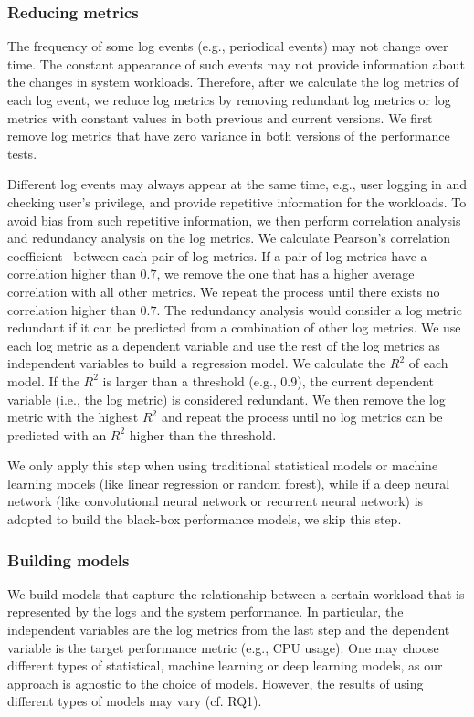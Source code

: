 \subsubsection{Reducing metrics}
The frequency of some log events (e.g., periodical events) may not change over time.
The constant appearance of such events may not provide information about the changes in system workloads.
Therefore, after we calculate the log metrics of each log event, we reduce log metrics by removing redundant log metrics or log metrics with constant values in both previous and current versions. We first remove log metrics that have zero variance in both versions of the performance tests. 

Different log events may always appear at the same time, e.g., user logging in and checking user's privilege, and provide repetitive information for the workloads. To avoid bias from such repetitive information, we then perform correlation analysis and redundancy analysis on the log metrics. We calculate Pearson's correlation coefficient~\citep{benesty2009pearson} between each pair of log metrics. If a pair of log metrics have a correlation higher than $0.7$, we remove the one that has a higher average correlation with all other metrics. 
We repeat the process until there exists no correlation higher than $0.7$. The redundancy analysis would consider a log metric redundant if it can be predicted from a combination of other log metrics. We use each log metric as a dependent variable and use the rest of the log metrics as independent variables to build a regression model. We calculate the $R^2$ of each model. If the $R^2$ is larger than a threshold (e.g., 0.9), the current dependent variable (i.e., the log metric) is considered redundant. We then remove the log metric with the highest $R^2$ and repeat the process until no log metrics can be predicted with an $R^2$ higher than the threshold. 

We only apply this step when using traditional statistical models or machine learning models (like linear regression or random forest), while if a deep neural network (like convolutional neural network or recurrent neural network) is adopted to build the black-box performance models, we skip this step.


\subsubsection{Building models}
We build models that capture the relationship between a certain workload that is represented by the logs and the system performance. In particular, the independent variables are the log metrics from the last step and the dependent variable is the target performance metric (e.g., CPU usage). One may choose different types of statistical, machine learning or deep learning models, as our approach is agnostic to the choice of models. However, the results of using different types of models may vary (cf. RQ1). 



